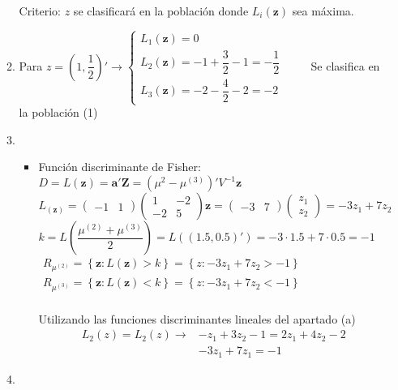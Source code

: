 \begin{enumerate}[label=\color{red}\textbf{\arabic*)}, leftmargin=*]
\begin{enumerate}[label=\color{red}\alph*)]
		Criterio: $z$ se clasificará en la población donde $L_i(\mathbf{z})$ sea máxima.
		
		\item {}
		
		Para $z=\left(1,\dfrac{1}{2}\right)'\longrightarrow\begin{cases}
			L_1(\mathbf{z})=0\\
			L_2(\mathbf{z})=-1+\dfrac{3}{2}-1=-\dfrac{1}{2}\\
			L_3(\mathbf{z})=-2-\dfrac{4}{2}-2=-2
		\end{cases}\qquad$ Se clasifica en la población (1)
		\item {}
		\begin{itemize}[label=]
			\item Función discriminante de Fisher: $D=L(\mathbf{z})=\mathbf{a'Z}=(\mu^{2}-\mu^{(3)})'V^{-1}\mathbf{z}$ \[ L_(\mathbf{z})=\begin{pmatrix}
				-1 & 1
			\end{pmatrix}\begin{pmatrix}
			1 & -2\\
			-2 & 5
			\end{pmatrix}\mathbf{z}=\begin{pmatrix}
			-3 & 7
			\end{pmatrix}\begin{pmatrix}
			z_1\\
			z_2
			\end{pmatrix}=-3z_1+7z_2 \] $k=L\left(\dfrac{\mu^{(2)}+\mu^{(3)}}{2}\right)=L\left((1.5, 0.5)'\right)=-3\cdot1.5+7\cdot0.5=-1$\\
			$\begin{array}{l}
				R_{\mu^{(2)}}=\left\{\mathbf{z}:L(\mathbf{z})>k\right\}=\left\{z:-3z_1+7z_2>-1\right\}\\
				R_{\mu^{(3)}}=\left\{\mathbf{z}:L(\mathbf{z})<k\right\}=\left\{z:-3z_1+7z_2<-1\right\}\\
			\end{array}$
			
			Utilizando las funciones discriminantes lineales del apartado (a) \[ \begin{array}{lc}
				L_2(z)=L_2(z)\longrightarrow&-z_1+3z_2-1=2z_1+4z_2-2\\
				&-3z_1+7z_1=-1
			\end{array} \]
		\end{itemize}
		\item {}
		

\end{enumerate}
\end{enumerate}
